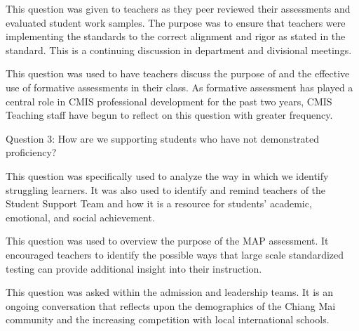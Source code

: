 
This question was given to teachers as they peer reviewed their assessments and evaluated student work samples. The purpose was to ensure that teachers were implementing the standards to the correct alignment and rigor as stated in the standard. This is a continuing discussion in department and divisional meetings.


This question was used to have teachers discuss the purpose of and the effective use of formative assessments in their class. As formative assessment has played a central role in CMIS professional development for the past two years, CMIS Teaching staff have begun to reflect on this question with greater frequency. 

Question 3: How are we supporting students who have not demonstrated proficiency? 

This question was specifically used to analyze the way in which we identify struggling learners. It was also used to identify and remind teachers of the Student Support Team and how it is a resource for students’ academic, emotional, and social achievement.


This question was used to overview the purpose of the MAP assessment. It encouraged teachers to identify the possible ways that large scale standardized testing can provide additional insight into their instruction. 


This question was asked within the admission and leadership teams. It is an ongoing conversation that reflects upon the demographics of the Chiang Mai community and the increasing competition with local international schools. 

